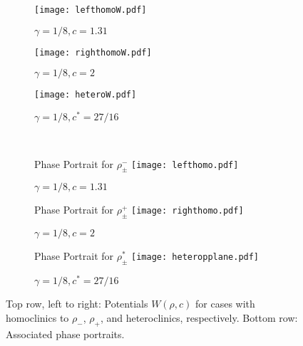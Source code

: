 \documentclass[10pt]{article}
\begin{document}
\begin{figure}[H]
\centering
  \begin{subfigure}[b]{0.31\textwidth}
    \centering
    \texttt{[image: lefthomoW.pdf]}
    \caption{$\gamma = 1/8, c= 1.31$}
    
  \end{subfigure}\hfill
    \begin{subfigure}[b]{0.31\textwidth}
   \centering
    \texttt{[image: righthomoW.pdf]}
    \caption{$\gamma = 1/8, c=2$}
   
  \end{subfigure}\hfill
 \begin{subfigure}[b]{0.31\textwidth}
    \centering
    \texttt{[image: heteroW.pdf]}
    \caption{$\gamma = 1/8, c^*=27/16$}
    
  \end{subfigure}\\[0.2in]
  \begin{subfigure}[b]{0.31\textwidth}
    \centering
  Phase Portrait for $\rho_{\pm}^-$
    \texttt{[image: lefthomo.pdf]}
    \caption{$\gamma = 1/8, c=1.31$}
    
  \end{subfigure}\hfill
    \begin{subfigure}[b]{0.31\textwidth}
   \centering
  Phase Portrait for $\rho_{\pm}^+$
    \texttt{[image: righthomo.pdf]}
    \caption{$\gamma = 1/8, c=2$}
   
  \end{subfigure}\hfill
     \begin{subfigure}[b]{0.31\textwidth}
   \centering
  Phase Portrait for $\rho_{\pm}^*$
    \texttt{[image: heteropplane.pdf]}
    \caption{$\gamma = 1/8, c^*=27/16$}
   
  \end{subfigure}
\caption{Top row, left to right: Potentials $W(\rho,c)$ for cases with homoclinics to $\rho_-$, $\rho_+$, and heteroclinics, respectively.  Bottom row: Associated phase portraits.}
\label{homophase}
\end{figure}
\end{document}
